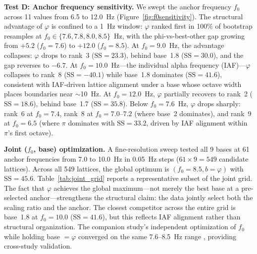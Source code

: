 \documentclass[11pt,a4paper]{article}
\newcommand{\phisym}{\varphi}
\newcommand{\fzero}{f_0}
\begin{document}
\textbf{Test D: Anchor frequency sensitivity.} We swept the anchor frequency $\fzero$ across 11 values from 6.5 to 12.0~Hz (Figure~\ref{fig:f0sensitivity}). The structural advantage of $\phisym$ is confined to a 1~Hz window: $\phisym$ ranked first in 100\% of bootstrap resamples at $\fzero \in \{7.6, 7.8, 8.0, 8.5\}$~Hz, with the phi-vs-best-other gap growing from $+5.2$ ($\fzero = 7.6$) to $+12.0$ ($\fzero = 8.5$). At $\fzero = 9.0$~Hz, the advantage collapses: $\phisym$ drops to rank~3 ($\text{SS} = 23.3$), behind base~1.8 ($\text{SS} = 30.0$), and the gap reverses to $-6.7$. At $\fzero = 10.0$~Hz---the individual alpha frequency (IAF)---$\phisym$ collapses to rank~8 ($\text{SS} = -40.1$) while base~1.8 dominates ($\text{SS} = 41.6$), consistent with IAF-driven lattice alignment under a base whose octave width places boundaries near $\sim$10~Hz. At $\fzero = 12.0$~Hz, $\phisym$ partially recovers to rank~2 ($\text{SS} = 18.6$), behind base~1.7 ($\text{SS} = 35.8$). Below $\fzero = 7.6$~Hz, $\phisym$ drops sharply: rank~6 at $\fzero = 7.4$, rank~8 at $\fzero = 7.0$--$7.2$ (where base~2 dominates), and rank~9 at $\fzero = 6.5$ (where $\pi$ dominates with $\text{SS} = 33.2$, driven by IAF alignment within $\pi$'s first octave).

\textbf{Joint ($\fzero$, base) optimization.} A fine-resolution sweep tested all 9 bases at 61 anchor frequencies from 7.0 to 10.0~Hz in 0.05~Hz steps ($61 \times 9 = 549$ candidate lattices). Across all 549 lattices, the global optimum is $(\fzero = 8.5, b = \phisym)$ with $\text{SS} = 45.6$. Table~\ref{tab:joint_grid} reports a representative subset of the joint grid. The fact that $\phisym$ achieves the global maximum---not merely the best base at a pre-selected anchor---strengthens the structural claim: the data jointly select both the scaling ratio and the anchor. The closest competitor across the entire grid is base~1.8 at $\fzero = 10.0$ ($\text{SS} = 41.6$), but this reflects IAF alignment rather than structural organization. The companion study's independent optimization of $\fzero$ while holding base $= \phisym$ converged on the same 7.6--8.5~Hz range \parencite{lacy2026golden}, providing cross-study validation.
\end{document}
